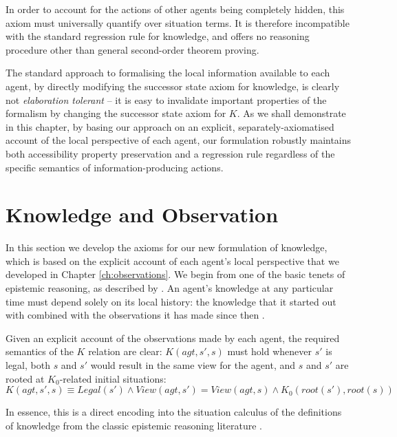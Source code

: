 In order to account for the actions of other agents being completely
hidden, this axiom must universally quantify over situation terms.
It is therefore incompatible with the standard regression rule for
knowledge, and \citep{Lesperance99sitcalc_approach} offers no reasoning
procedure other than general second-order theorem proving.

The standard approach to formalising the local information available
to each agent, by directly modifying the successor state axiom for
knowledge, is clearly not \emph{elaboration tolerant} -- it is easy
to invalidate important properties of the formalism by changing the
successor state axiom for $K$. As we shall demonstrate in this chapter,
by basing our approach on an explicit, separately-axiomatised account
of the local perspective of each agent, our formulation robustly maintains
both accessibility property preservation and a regression rule regardless
of the specific semantics of information-producing actions.


\section{Knowledge and Observation\label{sec:Knowledge:Observation}}

In this section we develop the axioms for our new formulation of knowledge,
which is based on the explicit account of each agent's local perspective
that we developed in Chapter \ref{ch:observations}. We begin from
one of the basic tenets of epistemic reasoning, as described by \citep{halpern90knowledge_distrib}.
An agent's knowledge at any particular time must depend solely on
its local history: the knowledge that it started out with combined
with the observations it has made since then .

Given an explicit account of the observations made by each agent,
the required semantics of the $K$ relation are clear: $K(agt,s',s)$
must hold whenever $s'$ is legal, both $s$ and $s'$ would result
in the same view for the agent, and $s$ and $s'$ are rooted at $K_{0}$-related
initial situations:\begin{equation}
K(agt,s',s)\equiv Legal(s')\wedge View(agt,s')=View(agt,s)\wedge K_{0}(root(s'),root(s))\label{eq:k-desired}\end{equation}


In essence, this is a direct encoding into the situation calculus
of the definitions of knowledge from the classic epistemic reasoning
literature \citep{parikh85dist_knowledge,halpern90knowledge_distrib,fagin95}.


